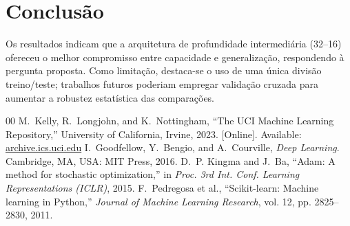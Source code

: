 \documentclass[conference]{IEEEtran}
\begin{document}
\section{Conclusão}
Os resultados indicam que a arquitetura de profundidade intermediária
(32--16) ofereceu o melhor compromisso entre capacidade e
generalização, respondendo à pergunta proposta. Como limitação,
destaca-se o uso de uma única divisão treino/teste; trabalhos futuros
poderiam empregar validação cruzada para aumentar a robustez
estatística das comparações.

\begin{thebibliography}{00}
M.~Kelly, R.~Longjohn, and K.~Nottingham, ``The UCI Machine Learning
Repository,'' University of California, Irvine, 2023. [Online].
Available: \href{https://archive.ics.uci.edu}{archive.ics.uci.edu}
I.~Goodfellow, Y.~Bengio, and A.~Courville, \emph{Deep Learning}.
Cambridge, MA, USA: MIT Press, 2016.
D.~P. Kingma and J.~Ba, ``Adam: A method for stochastic
optimization,'' in \emph{Proc. 3rd Int. Conf. Learning
Representations (ICLR)}, 2015.
F.~Pedregosa et al., ``Scikit-learn: Machine learning in Python,''
\emph{Journal of Machine Learning Research}, vol. 12, pp. 2825--2830,
2011.
\end{thebibliography}
\end{document}
